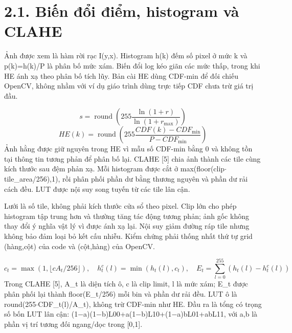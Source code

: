 \documentclass[12pt,a4paper]{extreport}
\begin{document}
\section*{2.1. Biến đổi điểm,\allowbreak{} histogram và CLAHE}
Ảnh được xem là hàm rời rạc I(y,\allowbreak{}x). Histogram h(k) đếm số pixel ở mức k và p(k)=\allowbreak{}h(k)/\allowbreak{}P là phân bố mức xám. Biến đổi log kéo giãn các mức thấp,\allowbreak{} trong khi HE ánh xạ theo phân bố tích lũy. Bản cài HE dùng CDF-min để đối chiếu OpenCV,\allowbreak{} không nhầm với ví dụ giáo trình dùng trực tiếp CDF chưa trừ giá trị đầu.
\par
\begin{equation}s=\operatorname{round}\left(255\frac{\ln(1+r)}{\ln(1+r_{\max})}\right)\tag{2.1}\end{equation}
\begin{equation}HE(k)=\operatorname{round}\left(255\frac{CDF(k)-CDF_{\min}}{P-CDF_{\min}}\right)\tag{2.2}\end{equation}
Ảnh hằng được giữ nguyên trong HE vì mẫu số CDF-min bằng 0 và không tồn tại thông tin tương phản để phân bố lại. CLAHE [5] chia ảnh thành các tile cùng kích thước sau đệm phản xạ. Mỗi histogram được cắt ở max(floor(clip\ensuremath{\cdot}tile\_area/\allowbreak{}256),\allowbreak{}1),\allowbreak{} rồi phân phối phần dư bằng thương nguyên và phần dư rải cách đều. LUT được nội suy song tuyến từ các tile lân cận.
\par
Lưới là số tile,\allowbreak{} không phải kích thước cửa sổ theo pixel. Clip lớn cho phép histogram tập trung hơn và thường tăng tác động tương phản; ảnh gốc không thay đổi ý nghĩa vật lý vì được ánh xạ lại. Nội suy giảm đường ráp tile nhưng không bảo đảm loại bỏ kết cấu nhiễu. Kiểm chứng phải thống nhất thứ tự grid (hàng,\allowbreak{}cột) của code và (cột,\allowbreak{}hàng) của OpenCV.
\par
\begin{equation}c_t=\max(1,\lfloor cA_t/256\rfloor),\quad h_t^c(l)=\min(h_t(l),c_t),\quad E_t=\sum_{l=0}^{255}(h_t(l)-h_t^c(l))\tag{2.3}\end{equation}
Trong CLAHE [5],\allowbreak{} A\_t là diện tích ô,\allowbreak{} c là clip limit,\allowbreak{} l là mức xám; E\_t được phân phối lại thành floor(E\_t/\allowbreak{}256) mỗi bin và phần dư rải đều. LUT ô là round(255\ensuremath{\cdot}CDF\_t(l)/\allowbreak{}A\_t),\allowbreak{} không trừ CDF-min như HE. Đầu ra là tổng có trọng số bốn LUT lân cận: (1\ensuremath{-}a)(1\ensuremath{-}b)L00+\allowbreak{}a(1\ensuremath{-}b)L10+\allowbreak{}(1\ensuremath{-}a)bL01+\allowbreak{}abL11,\allowbreak{} với a,\allowbreak{}b là phần vị trí tương đối ngang/\allowbreak{}dọc trong [0,\allowbreak{}1].
\par
\end{document}

